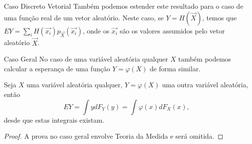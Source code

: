 %
\begin{frame}
\begin{block}{Caso Discreto Vetorial}
%
%
Também podemos estender este resultado para o caso de uma função
real de um vetor aleatório. Neste caso, se $Y=H(\vec{X})$, temos que
$EY=\sum_i H(\vec{x_i})p_{\vec{X}}(\vec{x_i})$, onde os $\vec{x_i}$ são os
valores assumidos pelo vetor aleatório $\vec{X}$.

\end{block}
%
\begin{block}{Caso Geral}
%
No caso de uma variável aleatória qualquer $X$ também podemos calcular a esperança de uma função $Y=\varphi(X)$ de forma similar.
\end{block}
\begin{teo}
Seja $X$ uma variável aleatória qualquer, $Y=\varphi(X)$ uma outra variável aleatória, então
$$EY=\int ydF_Y(y)=\int \varphi(x)dF_X(x),$$
desde que estas integrais existam.
\end{teo}

\begin{proof}
A prova no caso geral envolve Teoria da Medida e será omitida.
\end{proof}

\end{frame}
%
